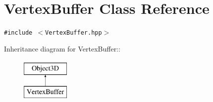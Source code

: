 \hypertarget{classm3g_1_1VertexBuffer}{
\section{VertexBuffer Class Reference}
\label{classm3g_1_1VertexBuffer}
}
{\tt \#include $<$VertexBuffer.hpp$>$}

Inheritance diagram for VertexBuffer::\begin{figure}[H]
\begin{center}
\leavevmode
\includegraphics[height=2cm]{classm3g_1_1VertexBuffer}
\end{center}
\end{figure}
